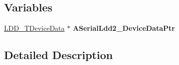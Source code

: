 \subsection*{Variables}
\begin{DoxyCompactItemize}
\item 
\mbox{\label{group___e_s_p01__module_gadee68051b76891befdaf56e3da755391}} 
\hyperlink{group___p_e___types__module_gac5cf1362f1f0e3a2ce71b1bf2276d091}{L\+D\+D\+\_\+\+T\+Device\+Data} $\ast$ {\bfseries A\+Serial\+Ldd2\+\_\+\+Device\+Data\+Ptr}
\end{DoxyCompactItemize}


\subsection{Detailed Description}
